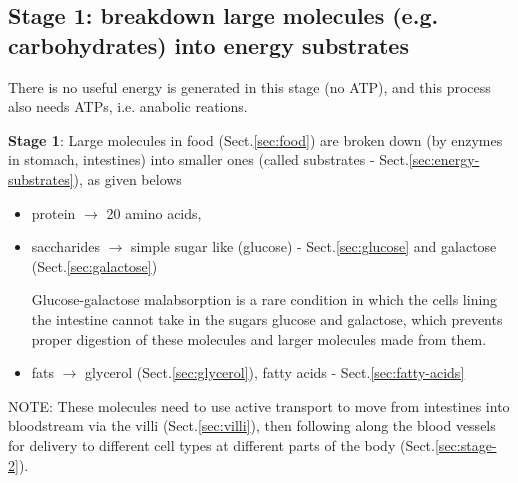 \subsection{Stage 1: breakdown large molecules (e.g. carbohydrates) into energy
substrates}
\label{sec:stage-1}

There is no useful energy is generated in this stage (no ATP), and this process
also needs ATPs, i.e. anabolic reations.

{\bf Stage 1}: Large molecules in food (Sect.\ref{sec:food}) are broken down (by
enzymes in stomach, intestines) into smaller ones (called substrates -
Sect.\ref{sec:energy-substrates}), as given belows
\begin{itemize}
  \item protein $\rightarrow$ 20 amino acids, 

  \item saccharides $\rightarrow$ simple sugar like
    (glucose) - Sect.\ref{sec:glucose} and galactose (Sect.\ref{sec:galactose})

\label{sec:glucose-galactose-malabsorption}
Glucose-galactose malabsorption is a rare condition in which the cells lining
the intestine cannot take in the sugars glucose and galactose, which prevents
proper digestion of these molecules and larger molecules made from them.

  \item fats $\rightarrow$ glycerol (Sect.\ref{sec:glycerol}), fatty acids -
  Sect.\ref{sec:fatty-acids}
\end{itemize}

NOTE: These molecules need to use active transport to move from intestines into
bloodstream via the villi (Sect.\ref{sec:villi}), then following along the blood
vessels for delivery to different cell types at different parts of the body
(Sect.\ref{sec:stage-2}).
  

